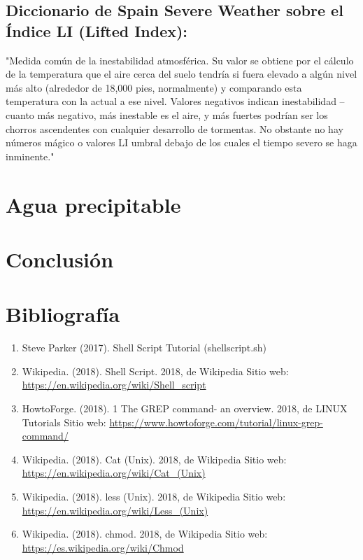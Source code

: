 \documentclass[12pt]{article}
\begin{document}
\subsection*{Diccionario de Spain Severe Weather sobre el Índice LI (Lifted Index):} 

"Medida común de la inestabilidad atmosférica. Su valor se obtiene por el cálculo de la temperatura que el aire cerca del suelo tendría si fuera elevado a algún nivel más alto (alrededor de 18,000 pies, normalmente) y comparando esta temperatura con la actual a ese nivel. Valores negativos indican inestabilidad – cuanto más negativo, más inestable es el aire, y más fuertes podrían ser los chorros ascendentes con cualquier desarrollo de tormentas. No obstante no hay números mágico o valores LI umbral debajo de los cuales el tiempo severo se haga inminente."

\section{Agua precipitable}
\noindent




\section{Conclusi\'on}
\noindent


\pagebreak
\section{Bibliograf\'ia}
\noindent

\begin{enumerate} [\hspace{16pt} 1.]
		\item Steve Parker (2017). Shell Script Tutorial (shellscript.sh)

		\item Wikipedia. (2018). Shell Script. 2018, de Wikipedia Sitio web: \url{https://en.wikipedia.org/wiki/Shell_script}
        
        \item HowtoForge. (2018). 1 The GREP command- an overview. 2018, de LINUX Tutorials Sitio web: \url{https://www.howtoforge.com/tutorial/linux-grep-command/}
        
        \item Wikipedia. (2018). Cat (Unix). 2018, de Wikipedia Sitio web: \url{https://en.wikipedia.org/wiki/Cat_(Unix)}
        
        \item Wikipedia. (2018). less (Unix). 2018, de Wikipedia Sitio web: \url{https://en.wikipedia.org/wiki/Less_(Unix)}
        
        \item Wikipedia. (2018). chmod. 2018, de Wikipedia Sitio web: \url{https://es.wikipedia.org/wiki/Chmod}
        
\end{enumerate}
\end{document}
